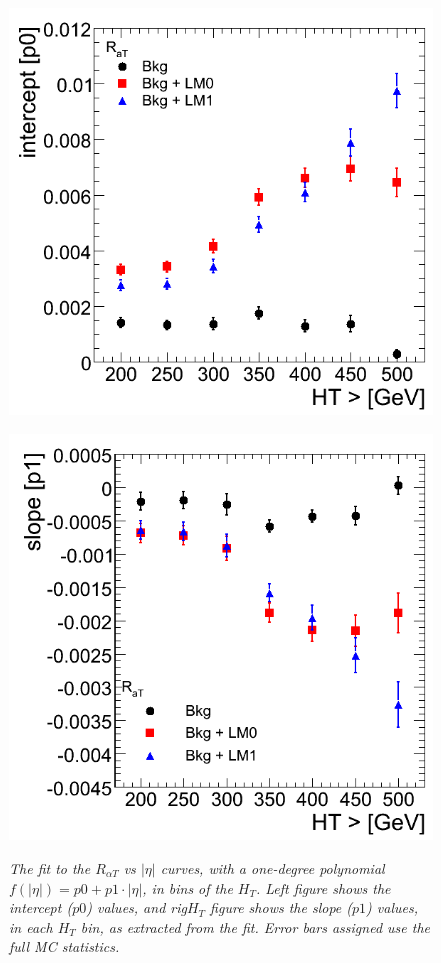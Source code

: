 \begin{figure}[h!]
\begin{minipage}[b]{0.5\linewidth}
\centering
{\label{fig:m$H_{T}$ov$H_{T}$}\includegraphics[scale=0.38]{./plots/aT-p0.png}} 
\end{minipage}
\begin{minipage}[b]{0.5\linewidth}
\centering
{\label{fig:$H_{T}$}\includegraphics[scale=0.38]{./plots/aT-p1.png}} 
\end{minipage}
\caption{\textit{The fit to the $R_{\alpha T}$ vs $|\eta|$ curves, with a one-degree polynomial $f(|\eta|)= p0 + p1 \cdot |\eta|$, in bins of the $H_{T}$. Left figure shows the intercept ($p0$) values, and rig$H_{T}$ figure shows the slope ($p1$) values, in each $H_{T}$ bin, as extracted from the fit. Error bars assigned use the full MC statistics.  } }
\label{fig:sum1}
\end{figure}


